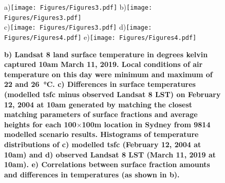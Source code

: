 \documentclass[final,3p,times,authoryear]{elsarticle}
\begin{document}
\begin{figure} 
\centering
a)\texttt{[image: Figures/Figures3.pdf]}
b)\texttt{[image: Figures/Figures3.pdf]}\\
c)\texttt{[image: Figures/Figures3.pdf]}
d)\texttt{[image: Figures/Figures4.pdf]}
e)\texttt{[image: Figures/Figures4.pdf]}
\caption{\bf b) Landsat 8 land surface temperature in degrees kelvin captured 10am March 11, 2019. Local conditions of air temperature on this day were minimum and maximum of 22 and 26\SI{}{\degreeCelsius}. c) Differences in surface temperatures (modelled \gls{tsfc} minus observed Landsat 8 LST) on February 12, 2004 at 10am generated by matching the closest matching parameters of surface fractions and average heights for each 100$\times$100m location in Sydney from 9814 modelled scenario results. Histograms of temperature distributions of c) modelled \gls{tsfc} (February 12, 2004 at 10am) and d) observed Landsat 8 LST (March 11, 2019 at 10am). e) Correlations between surface fraction amounts and differences in temperatures (as shown in b). }
 \label{fig:Sydney-Landsat-LST-11-03-2019}
 \label{fig:Sydney_TSFC12_85}
\end{figure}




\end{document}
